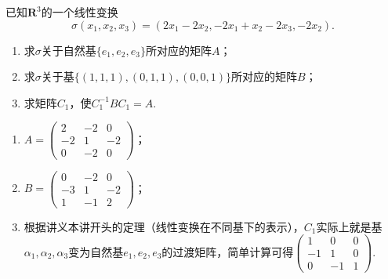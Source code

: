 \begin{exercise}
\begin{exgroup}
        \item 已知$\mathbf{R}^3$的一个线性变换
        \[\sigma(x_1,x_2,x_3)=(2x_1-2x_2,-2x_1+x_2-2x_3,-2x_2).\]
        \begin{enumerate}
            \item 求$\sigma$关于自然基$\{e_1,e_2,e_3\}$所对应的矩阵$A$；

            \item 求$\sigma$关于基$\{(1,1,1),(0,1,1),(0,0,1)\}$所对应的矩阵$B$；

            \item 求矩阵$C_1$，使$C_1^{-1}BC_1=A$.
        \end{enumerate}
        \begin{answer}
            \begin{enumerate}
                \item $A=\begin{pmatrix}
                              2 & -2 & 0 \\ -2 & 1 & -2 \\ 0 & -2 & 0
                          \end{pmatrix}$；

                \item $B=\begin{pmatrix}
                              0 & -2 & 0 \\ -3 & 1 & -2 \\ 1 & -1 & 2
                          \end{pmatrix}$；

                \item 根据讲义本讲开头的定理（线性变换在不同基下的表示），$C_1$实际上就是基$\alpha_1,\alpha_2,\alpha_3$变为自然基$e_1,e_2,e_3$的过渡矩阵，简单计算可得$\begin{pmatrix}
                              1 & 0 & 0 \\ -1 & 1 & 0 \\ 0 & -1 & 1
                          \end{pmatrix}$.
            \end{enumerate}
        \end{answer}


\end{exgroup}
\end{exercise}
